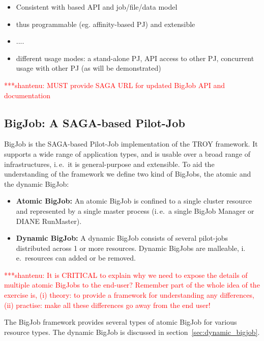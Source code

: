 \documentclass[conference,final]{IEEEtran}
\newcommand{\jhanote}[1]{ {\textcolor{red} { ***shantenu: #1 }}}
\newcommand{\jhanote}[1]{}
\begin{document}
\begin{itemize}
\item Consistent with based API and job/file/data model
\item thus programmable (eg. affinity-based PJ) and extensible 
\item ....
\item different usage modes: a stand-alone PJ, API access to other PJ,
  concurrent usage with other PJ (as will be demonstrated)
\end{itemize}

\jhanote{MUST provide SAGA URL for updated BigJob API and
  documentation}

\subsection{BigJob: A SAGA-based Pilot-Job}


BigJob is the SAGA-based Pilot-Job implementation of the TROY
framework. It supports a wide range of application types, and is
usable over a broad range of infrastructures, i.\,e.\ it is
general-purpose and extensible.  To aid the understanding of the
framework we define two kind of BigJobs, the atomic and the dynamic
BigJob:
\begin{itemize}
   \item  \textbf{Atomic BigJob:} An atomic BigJob is confined to a single 
   cluster resource and represented by a single master process (i.\,e.\ a 
   single BigJob Manager or DIANE RunMaster).
	\item \textbf{Dynamic BigJob:} A dynamic BigJob consists of several 
	pilot-jobs distributed across 1 or more resources. Dynamic BigJobs are 
	malleable, i.\,e.\ resources can added or be removed.
\end{itemize}

\jhanote{It is CRITICAL to explain why we need to expose the details
  of multiple atomic BigJobs to the end-user? Remember part of the
  whole idea of the exercise is, (i) theory: to provide a framework
  for understanding any differences, (ii) practise: make all these
  differences go away from the end user!}

The BigJob framework provides several types of atomic BigJob for
various resource types. The dynamic BigJob is discussed in
section~\ref{sec:dynamic_bigjob}.
\end{document}

